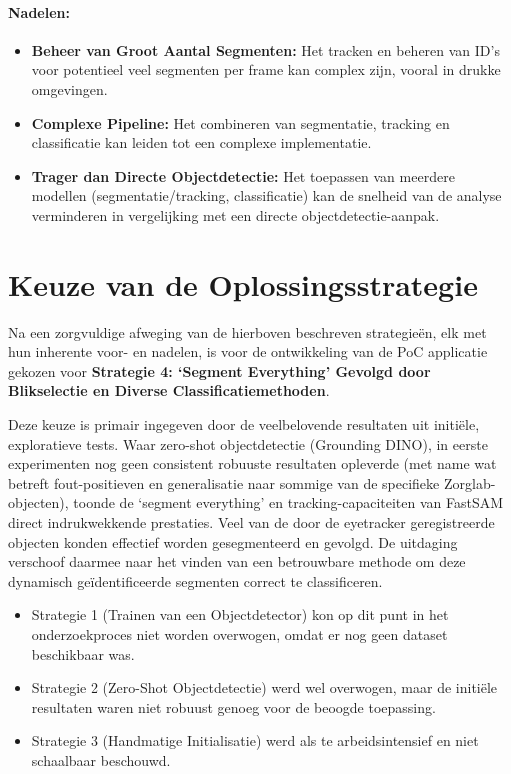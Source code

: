 \paragraph{Nadelen:}
\begin{itemize}
    \item \textbf{Beheer van Groot Aantal Segmenten:} Het tracken en beheren van ID's voor potentieel veel segmenten per frame kan complex zijn, vooral in drukke omgevingen.
    \item \textbf{Complexe Pipeline:} Het combineren van segmentatie, tracking en classificatie kan leiden tot een complexe implementatie.
    \item \textbf{Trager dan Directe Objectdetectie:} Het toepassen van meerdere modellen (segmentatie/tracking, classificatie) kan de snelheid van de analyse verminderen in vergelijking met een directe objectdetectie-aanpak.
\end{itemize}

\section{Keuze van de Oplossingsstrategie}

Na een zorgvuldige afweging van de hierboven beschreven strategieën, elk met hun inherente voor- en nadelen, is voor de ontwikkeling van de PoC 
applicatie gekozen voor \textbf{Strategie 4: `Segment Everything' Gevolgd door Blikselectie en Diverse Classificatiemethoden}.

Deze keuze is primair ingegeven door de veelbelovende resultaten uit initiële, exploratieve tests. 
Waar zero-shot objectdetectie (Grounding DINO), in eerste experimenten nog geen consistent robuuste resultaten opleverde
(met name wat betreft fout-positieven en generalisatie naar sommige van de specifieke Zorglab-objec\-ten), 
toonde de `segment everything' en tracking-capaciteiten van FastSAM direct indrukwekkende prestaties.
Veel van de door de eyetracker geregistreerde objecten konden effectief worden gesegmenteerd en gevolgd. 
De uitdaging verschoof daarmee naar het vinden van een betrouwbare methode om deze dynamisch geïdentificeerde segmenten correct te classificeren.

\begin{itemize}
    \item Strategie 1 (Trainen van een Objectdetector) kon op dit punt in het onderzoekproces niet worden overwogen, omdat er nog geen dataset beschikbaar was.
    \item Strategie 2 (Zero-Shot Objectdetectie) werd wel overwogen, maar de initiële resultaten waren niet robuust genoeg voor de beoogde toepassing.
    \item Strategie 3 (Handmatige Initialisatie) werd als te arbeidsintensief en niet\\ schaalbaar beschouwd.
\end{itemize}

